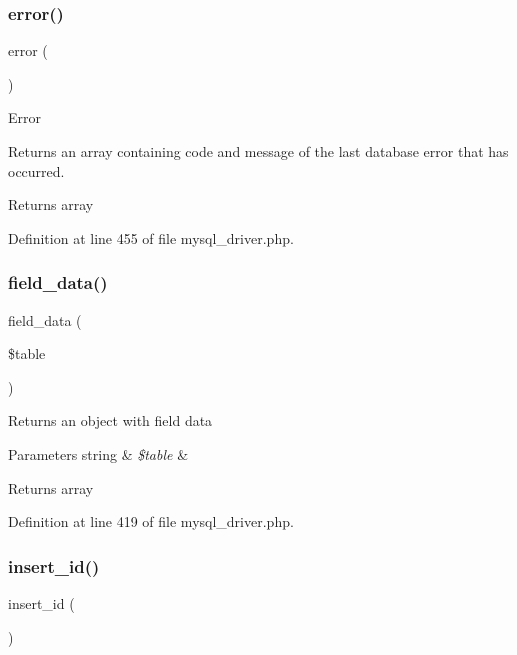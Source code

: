 \subsubsection{\texorpdfstring{error()}{error()}}
{\footnotesize\ttfamily error (\begin{DoxyParamCaption}{ }\end{DoxyParamCaption})}

Error

Returns an array containing code and message of the last database error that has occurred.

\begin{DoxyReturn}{Returns}
array 
\end{DoxyReturn}


Definition at line 455 of file mysql\+\_\+driver.\+php.

\mbox{\label{class_c_i___d_b__mysql__driver_a90355121e1ed009e0efdbd544ab56efa}} 
\subsubsection{\texorpdfstring{field\_data()}{field\_data()}}
{\footnotesize\ttfamily field\+\_\+data (\begin{DoxyParamCaption}\item[{}]{\$table }\end{DoxyParamCaption})}

Returns an object with field data


\begin{DoxyParams}[1]{Parameters}
string & {\em \$table} & \\
\hline
\end{DoxyParams}
\begin{DoxyReturn}{Returns}
array 
\end{DoxyReturn}


Definition at line 419 of file mysql\+\_\+driver.\+php.

\mbox{\label{class_c_i___d_b__mysql__driver_a933f2cde8dc7f87875e257d0a4902e99}} 
\subsubsection{\texorpdfstring{insert\_id()}{insert\_id()}}
{\footnotesize\ttfamily insert\+\_\+id (\begin{DoxyParamCaption}{ }\end{DoxyParamCaption})}

